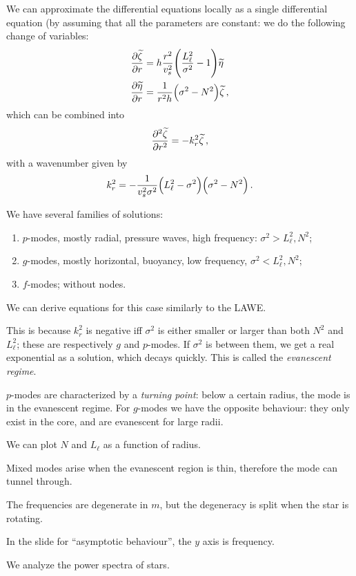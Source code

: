 \documentclass[main.tex]{subfiles}
\begin{document}
We can approximate the differential equations locally as a single differential equation (by assuming that all the parameters are constant: we do the following change of variables: 
%
\begin{subequations}
\begin{align}
\pdv{\widetilde{\zeta}}{r} &= h \frac{r^2}{v_s^2} \qty(\frac{L_{\ell}^2}{\sigma^2}  -1 )\widetilde{\eta}  \\
\pdv{\widetilde{\eta}}{r} &= \frac{1}{r^2h} \qty(\sigma^2-N^2) \widetilde{\zeta}
\,,
\end{align}
\end{subequations}
%
which can be combined into 
%
\begin{align}
\pdv[2]{\widetilde{\zeta}}{r} = - k_r^2 \widetilde{\zeta}
\,,
\end{align}
%
with a wavenumber given by
%
\begin{equation}
  k^2_r = - \frac{1}{v_s^2 \sigma^2 } \qty(L_\ell^2- \sigma^2   ) \qty(\sigma^2 - N^2)
  \,.
\end{equation}

We have several families of solutions: 

\begin{enumerate}
    \item \(p\)-modes, mostly radial, pressure waves, high frequency: \(\sigma^2> L^2_{\ell}, N^2\);
    \item \(g\)-modes, mostly horizontal, buoyancy, low frequency, \(\sigma^2 < L^2_{\ell}, N^2\);
    \item \(f\)-modes; without nodes.
\end{enumerate}

We can derive equations for this case similarly to the LAWE.


This is because \(k_r^2\) is negative iff \(\sigma^2\) is either smaller or larger than both \(N^2\) and \(L_\ell^2\); these are respectively \(g\) and \(p\)-modes. If \(\sigma^2\) is between them, we get a real exponential as a solution, which decays quickly.
This is called the \emph{evanescent regime}.

\(p\)-modes are characterized by a \emph{turning point}: below a certain radius, the mode is in the evanescent regime.
For \(g\)-modes we have the opposite behaviour: they only exist in the core, and are evanescent for large radii. 

We can plot \(N\) and \(L_\ell\) as a function of radius.

Mixed modes arise when the evanescent region is thin, therefore the mode can tunnel through.

The frequencies are degenerate in \(m\), but the degeneracy is split when the star is rotating.

In the slide for ``asymptotic behaviour'', the \(y\) axis is frequency.

We analyze the power spectra of stars.
\end{document}
